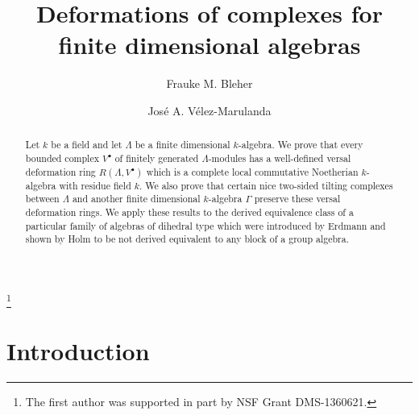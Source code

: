 \documentclass{amsart}
\theoremstyle{plain}
\theoremstyle{definition}
\theoremstyle{remark}
\begin{document}
\title{Deformations of complexes for finite dimensional algebras}

\author{Frauke M. Bleher}
\address{F.B.: Department of Mathematics\\University of Iowa\\
14 MacLean Hall\\Iowa City, IA 52242-1419, U.S.A.}
\thanks{The first author was supported in part by NSF Grant DMS-1360621.}
\author{Jos\'{e} A. V\'{e}lez-Marulanda}
\address{J.V.: Department of Mathematics \& Computer Science\\Valdosta State University\\
2072 Nevins Hall\\Valdosta, GA 31698-0040, U.S.A.}


\begin{abstract}
Let $k$ be a field and let $\Lambda$ be a finite dimensional $k$-algebra. We prove that every bounded complex $V^\bullet$
of finitely generated $\Lambda$-modules has a well-defined versal deformation ring $R(\Lambda,V^\bullet)$ which is
a complete local commutative Noetherian $k$-algebra with residue field $k$. We also prove that certain nice two-sided tilting
complexes between $\Lambda$ and another finite dimensional $k$-algebra $\Gamma$ preserve these versal deformation
rings. We apply these results to the derived equivalence class of a particular family of algebras of dihedral type
which were introduced by Erdmann and shown by Holm to be not derived equivalent to any block of a group algebra.
\end{abstract}

\maketitle

\section{Introduction}
\label{s:intro}
\setcounter{equation}{0}
\end{document}
